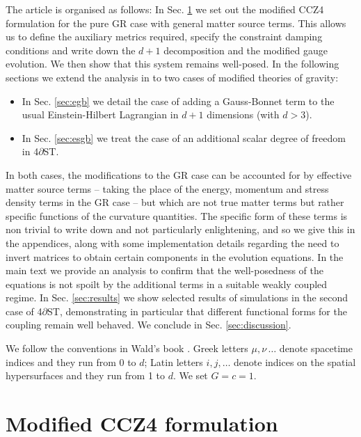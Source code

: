 \documentclass[reprint,aps,amsmath,amssymb,twoside,prd,showkeys,superscriptaddress,nofootinbib]{revtex4-2}
\begin{document}
The article is organised as follows: In Sec. \ref{sec:mCCZ4} we set out the modified CCZ4 formulation for the pure GR case with general matter source terms. This allows us to define the auxiliary metrics required, specify the constraint damping conditions and write down the $d+1$ decomposition and the modified gauge evolution. We then show that this system remains well-posed. In the following sections we extend the analysis in \cite{short_paper} to two cases of modified theories of gravity:
\begin{itemize}
    \item In Sec. \ref{sec:egb} we detail the case of adding a Gauss-Bonnet term to the usual Einstein-Hilbert Lagrangian in $d+1$ dimensions (with $d>3$).
    \item In Sec. \ref{sec:esgb} we treat the case of an additional scalar degree of freedom in 4$\partial$ST.
\end{itemize}
In both cases, the modifications to the GR case can be accounted for by effective matter source terms -- taking the place of the energy, momentum and stress density terms in the GR case -- but which are not true matter terms but rather specific functions of the curvature quantities. The specific form of these terms is non trivial to write down and not particularly enlightening, and so we give this in the appendices, along with some implementation details regarding the need to invert matrices to obtain certain components in the evolution equations. In the main text we provide an analysis to confirm that the well-posedness of the equations is not spoilt by the additional terms in a suitable weakly coupled regime.
In Sec. \ref{sec:results} we show selected results of simulations in the second case of 4$\partial$ST, demonstrating in particular that different functional forms for the coupling remain well behaved. We conclude in Sec. \ref{sec:discussion}. 

We follow the conventions in Wald's book \cite{Wald:1984rg}. Greek letters $\mu,\nu\,\ldots$ denote spacetime indices and they run from 0 to $d$; Latin letters $i,j,\ldots$ denote indices on the spatial hypersurfaces and they run from 1 to $d$. We set $G=c=1$. 

\section{Modified CCZ4 formulation}
\label{sec:mCCZ4}
\end{document}
